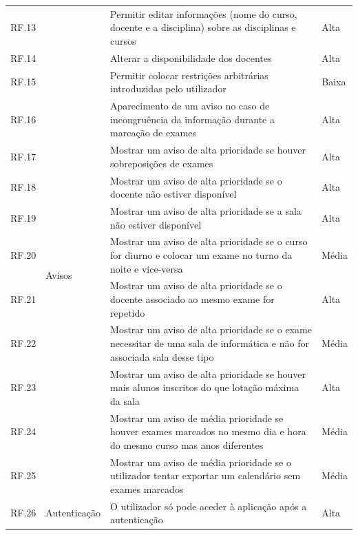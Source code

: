 \documentclass[11pt, twoside]{report}
\begin{document}
\begin{center}
\begin{longtable}{|m{1cm}|m{2.2cm}|m{10cm}|m{2cm}|}
			RF.13 && Permitir editar informações (nome do curso, docente e a disciplina) sobre as disciplinas e cursos & Alta\\
			
			RF.14 && Alterar a disponibilidade dos docentes & Alta\\
			
			RF.15 && Permitir colocar restrições arbitrárias introduzidas pelo utilizador & Baixa \\
			\hline	
			
			RF.16 &\multirow{9}{2cm}{Avisos}& Aparecimento de um aviso no caso de incongruência da informação durante a marcação de exames & Alta \\
			
			RF.17 &&Mostrar um aviso de alta prioridade se houver sobreposições de exames & Alta\\
			
			RF.18 && Mostrar um aviso de alta prioridade se o docente não estiver disponível & Alta \\
			
			RF.19 && Mostrar um aviso de alta prioridade se a sala não estiver disponível & Alta\\
			
			RF.20 && Mostrar um aviso de alta prioridade se o curso for diurno e colocar um exame no turno da noite e vice-versa & Média\\
			
			RF.21&&Mostrar um aviso de alta prioridade se o docente associado ao mesmo exame for repetido & Alta \\
			
			RF.22 && Mostrar um aviso de alta prioridade se o exame necessitar de uma sala de informática e não for associada sala desse tipo & Média\\
			
			RF.23 && Mostrar um aviso de alta prioridade se houver mais alunos inscritos do que  lotação máxima da sala & Alta\\
			
			RF.24 && Mostrar um aviso de média prioridade se houver exames marcados no mesmo dia e hora do mesmo curso mas anos diferentes & Média\\
			
			
			RF.25 && Mostrar um aviso de média prioridade se o utilizador tentar exportar um calendário sem exames marcados & Média\\
			\hline
			
			RF.26 &Autenticação& O utilizador só pode aceder à aplicação após a autenticação & Alta\\
			\hline
			

\end{longtable}
\end{center}
\end{document}
